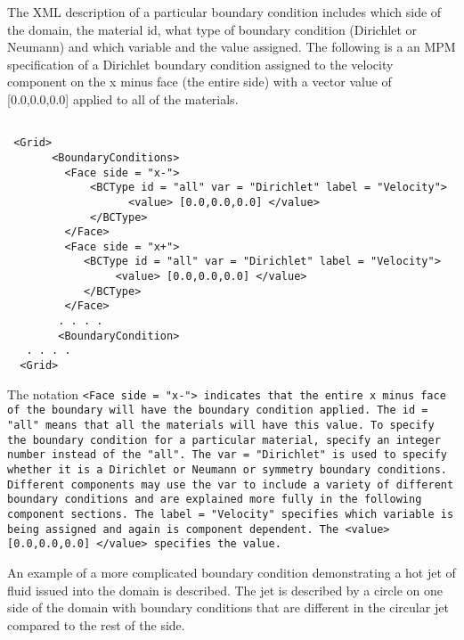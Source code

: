 The XML description of a particular boundary condition includes which
side of the domain, the material id, what type of boundary condition
(Dirichlet or Neumann) and which variable and the value assigned.  The
following is a an MPM specification of a Dirichlet boundary condition
assigned to the velocity component on the x minus face (the entire
side) with a vector value of [0.0,0.0,0.0] applied to all of the materials.

\begin{Verbatim}[fontsize=\footnotesize]

 <Grid>
       <BoundaryConditions>
         <Face side = "x-">
             <BCType id = "all" var = "Dirichlet" label = "Velocity">
                   <value> [0.0,0.0,0.0] </value>
             </BCType>
         </Face>
         <Face side = "x+">
            <BCType id = "all" var = "Dirichlet" label = "Velocity">
                 <value> [0.0,0.0,0.0] </value>
            </BCType>
         </Face>
        . . . .
        <BoundaryCondition>
   . . . .
  <Grid>

\end{Verbatim}

The notation \tt <Face side = "x-"> \normalfont indicates that the
entire x minus face of the boundary will have the boundary condition
applied.  The \tt id = "all" \normalfont means that all the
materials will have this value.  To specify the boundary condition for
a particular material, specify an integer number instead of the
"all".  The \tt var = "Dirichlet" \normalfont is used to specify
whether it is a Dirichlet or Neumann or symmetry boundary conditions.
Different components may use the \tt var \normalfont to include a
variety of different boundary conditions and are explained more fully
in the following component sections.  The \tt label = "Velocity"
\normalfont specifies which variable is being assigned and again is
component dependent.  The \tt <value> [0.0,0.0,0.0] </value>
\normalfont specifies the value.

An example of a more complicated boundary condition demonstrating a
hot jet of fluid issued into the domain is described.  The jet is
described by a circle on one side of the domain with boundary
conditions that are different in the circular jet compared to the rest
of the side.

